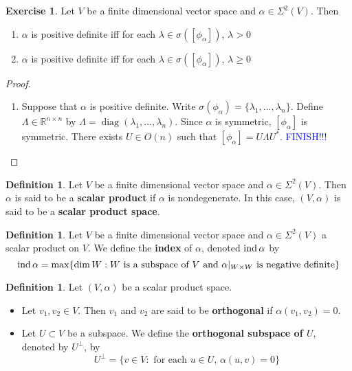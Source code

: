 \documentclass{book}
\theoremstyle{definition}
\newtheorem{defn}[definition]{Definition}
\newtheorem{ex}[definition]{Exercise}
\newcommand{\al}{\alpha}
\newcommand{\lam}{\lambda}
\newcommand{\sig}{\sigma}
\newcommand{\Lam}{\Lambda}
\newcommand{\Sig}{\Sigma}
\newcommand{\R}{\mathbb{R}}
\DeclareMathOperator{\diag}{\text{diag}}
\DeclareMathOperator*{\ind}{\text{\text{ind}}}
\DeclareMathOperator*{\0}{\mbf{0}}
\DeclareMathOperator*{\1}{\mbf{1}}
\newcommand{\tbf}[1]{\textbf{#1}}
\newcommand{\tcb}[1]{\textcolor{blue}{#1}}
\begin{document}
	\begin{ex}
		Let $V$ be a finite dimensional vector space and $\al \in \Sig^2(V)$. Then 
		\begin{enumerate}
			\item $\al$ is positive definite iff for each $\lam \in \sig([\phi_{\al}])$, $\lam > 0$
			\item $\al$ is positive definite iff for each $\lam \in \sig([\phi_{\al}])$, $\lam \geq 0$
		\end{enumerate}
		
		\begin{proof}\
			\begin{enumerate}
				\item Suppose that $\al$ is positive definite. Write $\sig(\phi_{\al}) = \{ \lam_1, \ldots, \lam_n\}$. Define $\Lam \in \R^{n \times n}$ by $\Lam = \diag(\lam_1, \ldots, \lam_n)$.  Since $\al$ is symmetric, $[\phi_{\al}]$ is symmetric. There exists $U \in O(n)$ such that $[\phi_{\al}] = U \Lam U^*$. 
				\tcb{FINISH!!!}
			\end{enumerate}
		\end{proof}
	\end{ex}

		\begin{defn}
		Let $V$ be a finite dimensional vector space and $\al \in \Sig^2(V)$. Then $\al$ is said to be a \tbf{scalar product} if $\al$ is nondegenerate. In this case, $(V, \al)$ is said to be a \tbf{scalar product space}. 
	\end{defn}
	
	\begin{defn}
		Let $V$ be a finite dimensional vector space and $\al \in \Sig^2(V)$ a scalar product on $V$. We define the \tbf{index} of $\al$, denoted $\ind \al$ by 
		$$\ind \al = \max \{ \dim W: W \text{ is a subspace of $V$ and $\al|_{W \times W}$ is negative definite} \}$$
	\end{defn}

	\begin{defn}
		Let $(V, \al)$ be a scalar product space. 
		\begin{itemize}
			\item Let $v_1, v_2 \in V$. Then $v_1$ and $v_2$ are said to be \tbf{orthogonal} if $\al(v_1, v_2) = 0$. 
			\item Let $U \subset V$ be a subspace. We define the \tbf{orthogonal subspace of $U$}, denoted by $U^{\perp}$, by 
			$$U^{\perp} = \{v \in V: \text{ for each $u \in U$, $\al(u, v) = 0$}\}$$
		\end{itemize}
	\end{defn}
\end{document}
